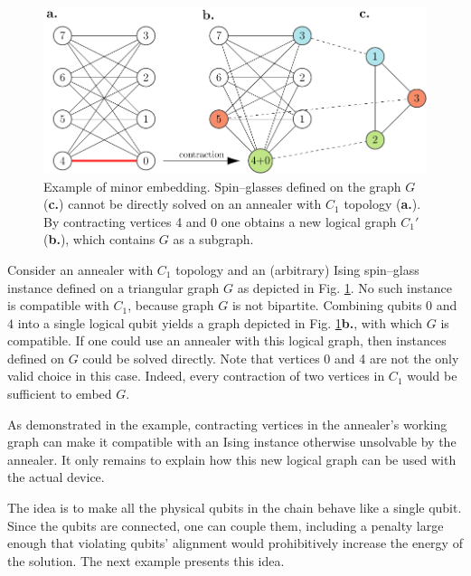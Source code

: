 \begin{example}
\label{ex:minor-embedding}
\begin{figure}[b]
    \includegraphics[width=\textwidth]{figures/minor-embedding}
    \caption{
        Example of minor embedding. Spin--glasses defined on the graph $G$ (\textbf{c.}) cannot
        be directly solved on an annealer with $C_1$ topology (\textbf{a.}). By contracting vertices
        4 and 0 one obtains a new logical graph $C_1'$ (\textbf{b.}), which contains $G$ as a
        subgraph.
    }
    \label{fig:minor-embedding}
\end{figure}

Consider an annealer with $C_1$ topology and an (arbitrary) Ising spin--glass instance
defined on a triangular graph $G$ as depicted in Fig. \ref{fig:minor-embedding}. No
such instance is compatible with $C_1$, because graph $G$ is not bipartite. Combining qubits $0$
and $4$ into a single logical qubit yields a graph depicted in Fig.
\ref{fig:minor-embedding}\textbf{b.}, with which $G$ is compatible. If one could use an annealer
with this logical graph, then instances defined on $G$ could be solved directly. Note that vertices
0 and 4 are not the only valid choice in this case. Indeed, every contraction of two vertices in
$C_1$ would be sufficient to embed $G$.
\end{example}

As demonstrated in the example, contracting vertices in the annealer's working graph can make it
compatible with an Ising instance otherwise unsolvable by the annealer. It only remains to
explain how this new logical graph can be used with the actual device.

The idea is to make all the physical qubits in the chain behave like a single qubit. Since the
qubits are connected, one can couple them, including a penalty large enough that violating qubits'
alignment would prohibitively increase the energy of the solution. The next example presents this idea.

